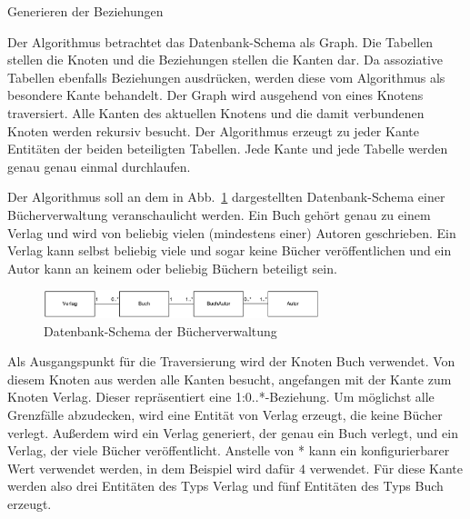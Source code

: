 	Generieren der Beziehungen

  Der Algorithmus betrachtet das Datenbank-Schema als Graph. Die Tabellen stellen die Knoten und die Beziehungen stellen die Kanten dar.
  Da assoziative Tabellen ebenfalls Beziehungen ausdrücken, werden diese vom Algorithmus als besondere Kante behandelt. Der Graph wird
	ausgehend von eines Knotens traversiert. Alle Kanten des aktuellen Knotens und die damit verbundenen Knoten werden rekursiv besucht.
	Der Algorithmus erzeugt zu jeder Kante Entitäten der beiden beteiligten Tabellen. %
	Jede Kante und jede Tabelle werden genau genau einmal durchlaufen.
	
  Der Algorithmus soll an dem in Abb.~\ref{database} dargestellten Datenbank-Schema einer Bücherverwaltung veranschaulicht werden. Ein
	Buch gehört genau zu einem Verlag und wird von beliebig vielen (mindestens einer) Autoren geschrieben. Ein Verlag kann selbst beliebig
	viele und sogar keine Bücher veröffentlichen und ein Autor kann an keinem oder beliebig Büchern beteiligt sein.
	
	\begin{figure}[htb]
		\begin{center}
			\includegraphics[width=8cm]{images/database.png}
			\caption{\label{database}Datenbank-Schema der Bücherverwaltung}
		\end{center}
	\end{figure}
	
	Als Ausgangspunkt für die Traversierung wird der Knoten Buch verwendet. Von diesem Knoten aus werden alle Kanten besucht, angefangen mit
	der Kante zum Knoten Verlag. Dieser repräsentiert eine 1:0..*-Beziehung. Um möglichst alle Grenzfälle abzudecken, wird eine Entität
	von Verlag erzeugt, die keine Bücher verlegt. Außerdem wird ein Verlag generiert, der genau ein Buch verlegt, und ein Verlag, der viele
	Bücher veröffentlicht. Anstelle von * kann ein konfigurierbarer Wert verwendet werden, in dem Beispiel wird dafür $4$ verwendet. Für
	diese Kante werden also drei Entitäten des Typs Verlag und fünf Entitäten des Typs Buch erzeugt.
	
